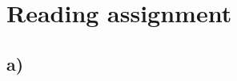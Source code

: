 \documentclass[12pt,a4paper]{article}
\begin{document}
\begin{comment}
\begin{figure}[ht!]
\centering
	\texttt{[image: images\_files/Aufgabe-3d).png]}
	\caption{Vergleich}
	\label{fig:YourLabe7}
\end{figure}

\newpage



\end{comment}

\section{Reading assignment}


\subsection{a)} 

\begin{comment}


Im Paper heisst es \glqq In order to combat
jamming attacks, existing wireless systems typically consider the employment of spread spectrum
techniques, including DSSS [55], [56] and FHSS
solutions [57]. To be specific, DSSS employs a PN
sequence to spread the spectrum of the original
signal to a wide frequency bandwidth\grqq.\\\\
Das heisst, dass sogenannte Frequenzspreizung benutzt werden. 
DSSS benutzt dafür pseudo noise um das original Signal auf eine weite Frequenzbandbreite zu spreizen. Somit wird der Aufwand für einen Angreifer deutlich erhöht.
\end{comment}
\end{document}
